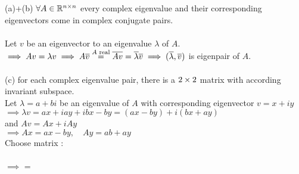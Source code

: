 \begin{SolutionSheet}[\ref{sheet5}]
\begin{onehalfspace}
  \begin{Solution}
    (a)+(b) \Claim $\forall A \in \mathbb{R}^{n\times n}$ every complex eigenvalue and their 
    corresponding eigenvectors come in complex conjugate pairs. \\
    \\
    \Proof Let $v$ be an eigenvector to an eigenvalue $\lambda$ of $A$.\\
    $\implies Av = \lambda v \\
    \implies A \overline{v} \stackrel{A \text{ real}}{=} \overline{Av} = \overline{\lambda} \overline{v} \\
    \implies (\overline{\lambda}, \overline{v})$ is eigenpair of $A$. \\
    \\
    (c) \Claim for each complex eigenvalue pair, there is a $2\times 2$ matrix with according invariant subspace.\\
    \Proof Let $\lambda=a+bi$ be an eigenvalue of $A$ with corresponding eigenvector $v= x+iy$ \\
    $\implies \lambda v = ax+iay+ibx-by = (ax-by) + i(bx+ay)$ \\
    and  $Av = Ax + iAy$ \\
    $\implies Ax = ax-by, \quad Ay = ab+ay$ \\
    Choose matrix : \\
    \\
    $\implies$   = 
  \end{Solution}


\end{onehalfspace}
\end{SolutionSheet}
